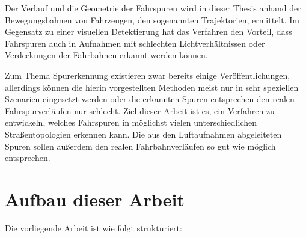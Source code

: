 Der Verlauf und die Geometrie der Fahrspuren wird in dieser Thesis anhand der Bewegungsbahnen von Fahrzeugen, den sogenannten Trajektorien,
ermittelt. Im Gegensatz zu einer visuellen Detektierung hat das Verfahren den Vorteil, dass Fahrspuren auch in Aufnahmen
mit schlechten Lichtverhältnissen oder Verdeckungen der Fahrbahnen erkannt werden können.

Zum Thema Spurerkennung existieren zwar bereits einige Veröffentlichungen, allerdings können die hierin
vorgestellten Methoden meist nur in sehr speziellen Szenarien eingesetzt werden oder die erkannten Spuren
entsprechen den realen Fahrspurverläufen nur schlecht. Ziel dieser Arbeit ist es, ein Verfahren zu entwickeln,
welches Fahrspuren in möglichst vielen unterschiedlichen Straßentopologien erkennen kann. Die aus den
Luftaufnahmen abgeleiteten Spuren sollen außerdem den realen Fahrbahnverläufen so gut wie möglich entsprechen.

\section{Aufbau dieser Arbeit}
\label{sec:aufbau}

Die vorliegende Arbeit ist wie folgt strukturiert:

